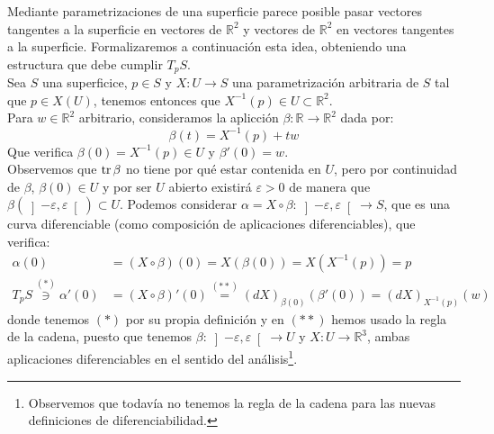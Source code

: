 \noindent
Mediante parametrizaciones de una superficie parece posible pasar vectores tangentes a la superficie en vectores de $\mathbb{R}^2$ y vectores de $\mathbb{R}^2$ en vectores tangentes a la superficie. Formalizaremos a continuación esta idea, obteniendo una estructura que debe cumplir $T_pS$.\\

\noindent
Sea $S$ una superficice, $p\in S$ y $X:U\to S$ una parametrización arbitraria de $S$ tal que $p\in X(U)$, tenemos entonces que $X^{-1}(p)\in U\subset \mathbb{R}^2$.\\

\noindent
Para $w\in \mathbb{R}^2$ arbitrario, consideramos la aplicción $\beta:\mathbb{R}\to \mathbb{R}^2$ dada por:
\begin{equation*}
    \beta(t) = X^{-1}(p) + tw
\end{equation*}
Que verifica $\beta(0) = X^{-1}(p)\in U$ y $\beta'(0) = w$.\\

\noindent
Observemos que $\operatorname{tr}\beta$ no tiene por qué estar contenida en $U$, pero por continuidad de $\beta$, $\beta(0)\in U$ y por ser $U$ abierto existirá $\varepsilon>0$ de manera que $\beta\left(\left]-\varepsilon,\varepsilon\right[\right)\subset U$. Podemos considerar $\alpha=X\circ \beta:\left]-\varepsilon,\varepsilon\right[\to S$, que es una curva diferenciable (como composición de aplicaciones diferenciables), que verifica:
\begin{align*}
    \alpha(0) &= (X\circ \beta)(0) = X(\beta(0)) = X(X^{-1}(p)) = p \\
    T_pS \stackrel{(\ast)}{\ni} \alpha'(0) &= (X\circ \beta)'(0) \stackrel{(\ast\ast)}{=} (dX)_{\beta(0)}(\beta'(0)) = (dX)_{X^{-1}(p)}(w)
\end{align*}
donde tenemos $(\ast)$ por su propia definición y en $(\ast\ast)$ hemos usado la regla de la cadena, puesto que tenemos $\beta:\left]-\varepsilon,\varepsilon\right[\to U$ y $X:U\to \mathbb{R}^3$, ambas aplicaciones diferenciables en el sentido del análisis\footnote{Observemos que todavía no tenemos la regla de la cadena para las nuevas definiciones de diferenciabilidad.}.\\

